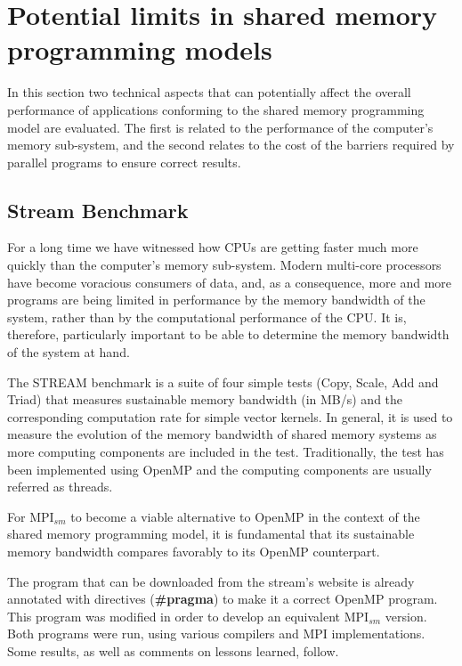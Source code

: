 \section{Potential limits in shared memory programming models} \label{potentialLimits}

In this section two technical aspects that can potentially affect the overall performance of applications conforming to the shared memory programming model are evaluated. The first is related to the performance of the computer's memory sub-system, and the second relates to the cost of the barriers required by parallel programs to ensure correct results.


\subsection*{Stream Benchmark}

For a long time we have witnessed how CPUs are getting faster much more quickly than the computer's memory sub-system. Modern multi-core processors have become voracious consumers of data, and, as a consequence, more and more programs are being limited in performance by the memory bandwidth of the system, rather than by the computational performance of the CPU\cite{McCalpin2007}. It is, therefore, particularly important to be able to determine the memory bandwidth of the system at hand. 

\medskip


The STREAM benchmark\cite{McCalpin2007} is a suite of four simple tests (Copy, Scale, Add and Triad) that measures sustainable memory bandwidth (in MB/s) and the corresponding computation rate for simple vector kernels. In general, it is used to measure the evolution of the memory bandwidth of shared memory systems as more computing components are included in the test. Traditionally, the test has been implemented using OpenMP and the computing components are usually referred as threads.

\medskip

For MPI$_{sm}$ to become a viable alternative to OpenMP in the context of the shared memory programming model, it is fundamental that its sustainable memory bandwidth compares favorably to its OpenMP counterpart.

\medskip

The program that can be downloaded from the stream's website \cite{McCalpin2007} is already annotated with directives (\textbf{\#pragma}) to make it a correct OpenMP program. This program was modified in order to develop an equivalent  MPI$_{sm}$ version. Both programs were run, using various compilers and MPI implementations. Some results, as well as comments on lessons learned, follow.

